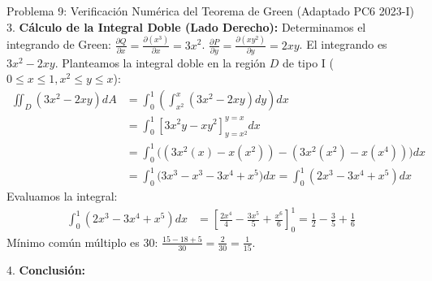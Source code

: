 \documentclass[11pt,a4paper]{article}
\begin{document}
\begin{ejerciciobox}{Problema 9: Verificación Numérica del Teorema de Green (Adaptado PC6 2023-I)}
3. \textbf{Cálculo de la Integral Doble (Lado Derecho):}
Determinamos el integrando de Green:
$\frac{\partial Q}{\partial x} = \frac{\partial (x^3)}{\partial x} = 3x^2$.
$\frac{\partial P}{\partial y} = \frac{\partial (xy^2)}{\partial y} = 2xy$.
El integrando es $3x^2 - 2xy$.
Planteamos la integral doble en la región $D$ de tipo I ($0 \le x \le 1, x^2 \le y \le x$):
\begin{align*}
\iint_D (3x^2 - 2xy) dA &= \int_0^1 \left( \int_{x^2}^x (3x^2 - 2xy) dy \right) dx \\
&= \int_0^1 \left[ 3x^2 y - x y^2 \right]_{y=x^2}^{y=x} dx \\
&= \int_0^1 \Big( (3x^2(x) - x(x^2)) - (3x^2(x^2) - x(x^4)) \Big) dx \\
&= \int_0^1 \Big( 3x^3 - x^3 - 3x^4 + x^5 \Big) dx = \int_0^1 (2x^3 - 3x^4 + x^5) dx
\end{align*}
Evaluamos la integral:
\begin{align*}
\int_0^1 (2x^3 - 3x^4 + x^5) dx &= \left[ \frac{2x^4}{4} - \frac{3x^5}{5} + \frac{x^6}{6} \right]_0^1 = \frac{1}{2} - \frac{3}{5} + \frac{1}{6}
\end{align*}
Mínimo común múltiplo es $30$:
$\frac{15 - 18 + 5}{30} = \frac{2}{30} = \frac{1}{15}$.

4. \textbf{Conclusión:}
\end{ejerciciobox}
\end{document}
